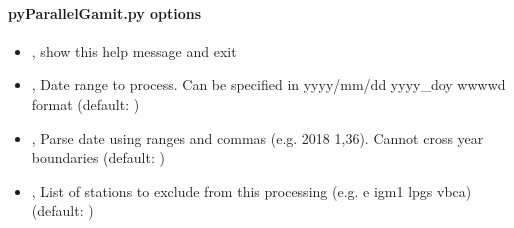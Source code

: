 \documentclass[letterpaper,10pt,english]{sphinxmanual}
\begin{document}
\paragraph{pyParallelGamit.py options}
\label{\detokenize{parallel_gamit:pyParallelGamit.py-options}}\begin{itemize}
\item {} 
\sphinxAtStartPar
{\hyperref[\detokenize{parallel_gamit:pyParallelGamit.py--h}]{}}, {\hyperref[\detokenize{parallel_gamit:pyParallelGamit.py---help}]{}} \sphinxhyphen{} show this help message and exit

\item {} 
\sphinxAtStartPar
{\hyperref[\detokenize{parallel_gamit:pyParallelGamit.py--d}]{}} , {\hyperref[\detokenize{parallel_gamit:pyParallelGamit.py---date}]{}}  \sphinxhyphen{} Date range to process. Can be specified in yyyy/mm/dd yyyy\_doy wwww\sphinxhyphen{}d format (default: )

\item {} 
\sphinxAtStartPar
{\hyperref[\detokenize{parallel_gamit:pyParallelGamit.py--dp}]{}} , {\hyperref[\detokenize{parallel_gamit:pyParallelGamit.py---date_parser}]{}}  \sphinxhyphen{} Parse date using ranges and commas (e.g. 2018 1,3\sphinxhyphen{}6). Cannot cross year boundaries (default: )

\item {} 
\sphinxAtStartPar
{\hyperref[\detokenize{parallel_gamit:pyParallelGamit.py--e}]{}} , {\hyperref[\detokenize{parallel_gamit:pyParallelGamit.py---exclude}]{}}  \sphinxhyphen{} List of stations to exclude from this processing (e.g. \sphinxhyphen{}e igm1 lpgs vbca) (default: )


\end{itemize}
\end{document}
